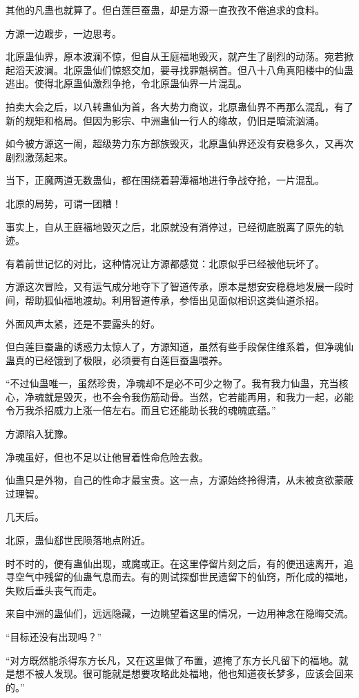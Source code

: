 \begin{this_body}
其他的凡蛊也就算了。但白莲巨蚕蛊，却是方源一直孜孜不倦追求的食料。

方源一边踱步，一边思考。

北原蛊仙界，原本波澜不惊，但自从王庭福地毁灭，就产生了剧烈的动荡。宛若掀起滔天波澜。北原蛊仙们惊怒交加，要寻找罪魁祸首。但八十八角真阳楼中的仙蛊逃出。使得北原蛊仙激烈争抢，令北原蛊仙界一片混乱。

拍卖大会之后，以八转蛊仙为首，各大势力商议，北原蛊仙界不再那么混乱，有了新的规矩和格局。但因为影宗、中洲蛊仙一行人的缘故，仍旧是暗流汹涌。

如今被方源这一闹，超级势力东方部族毁灭，北原蛊仙界还没有安稳多久，又再次剧烈激荡起来。

当下，正魔两道无数蛊仙，都在围绕着碧潭福地进行争战夺抢，一片混乱。

北原的局势，可谓一团糟！

事实上，自从王庭福地毁灭之后，北原就没有消停过，已经彻底脱离了原先的轨迹。

有着前世记忆的对比，这种情况让方源都感觉：北原似乎已经被他玩坏了。

方源这次冒险，又有运气成分地夺下了智道传承，原本是想安安稳稳地发展一段时间，帮助狐仙福地渡劫。利用智道传承，参悟出见面似相识这类仙道杀招。

外面风声太紧，还是不要露头的好。

但白莲巨蚕蛊的诱惑力太惊人了，方源知道，虽然有些手段保住维系着，但净魂仙蛊真的已经饿到了极限，必须要有白莲巨蚕蛊喂养。

“不过仙蛊唯一，虽然珍贵，净魂却不是必不可少之物了。我有我力仙蛊，充当核心，净魂就是毁灭，也不会令我伤筋动骨。当然，它若能再用，和我力一起，必能令万我杀招威力上涨一倍左右。而且它还能助长我的魂魄底蕴。”

方源陷入犹豫。

净魂虽好，但也不足以让他冒着性命危险去救。

仙蛊只是外物，自己的性命才最宝贵。这一点，方源始终拎得清，从未被贪欲蒙蔽过理智。

几天后。

北原，蛊仙郄世民陨落地点附近。

时不时的，便有蛊仙出现，或魔或正。在这里停留片刻之后，有的便迅速离开，追寻空气中残留的仙蛊气息而去。有的则试探郄世民遗留下的仙窍，所化成的福地，失败后垂头丧气而走。

来自中洲的蛊仙们，远远隐藏，一边眺望着这里的情况，一边用神念在隐晦交流。

“目标还没有出现吗？”

“对方既然能杀得东方长凡，又在这里做了布置，遮掩了东方长凡留下的福地。就是想不被人发现。很可能就是想要攻略此处福地，他也知道夜长梦多，应该会回来的。”


\end{this_body}

